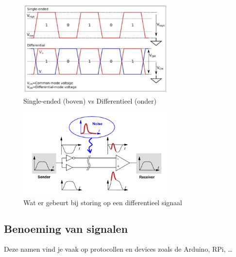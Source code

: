 \documentclass{article}
\begin{document}
\begin{figure}[H]
    \centering
    \includegraphics[width=0.7\textwidth]{Screenshot_20200323_123305.png}
    \caption{Single-ended (boven) vs Differentieel (onder)}
\end{figure}

\begin{figure}[H]
    \centering
    \includegraphics[width=0.7\textwidth]{Screenshot_20200323_123231.png}
    \caption{Wat er gebeurt bij storing op een differentieel signaal}
\end{figure}

\subsection{Benoeming van signalen}
Deze namen vind je vaak op protocollen en devices zoals de Arduino, RPi, \dots
\end{document}
